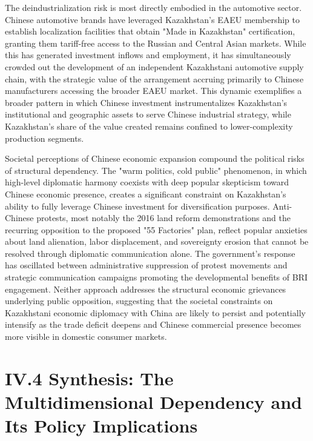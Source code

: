 \documentclass[12pt]{article}
\begin{document}
The deindustrialization risk is most directly embodied in the automotive sector. Chinese automotive brands have leveraged Kazakhstan's EAEU membership to establish localization facilities that obtain "Made in Kazakhstan" certification, granting them tariff-free access to the Russian and Central Asian markets. While this has generated investment inflows and employment, it has simultaneously crowded out the development of an independent Kazakhstani automotive supply chain, with the strategic value of the arrangement accruing primarily to Chinese manufacturers accessing the broader EAEU market. This dynamic exemplifies a broader pattern in which Chinese investment instrumentalizes Kazakhstan's institutional and geographic assets to serve Chinese industrial strategy, while Kazakhstan's share of the value created remains confined to lower-complexity production segments.\par

Societal perceptions of Chinese economic expansion compound the political risks of structural dependency. The "warm politics, cold public" phenomenon, in which high-level diplomatic harmony coexists with deep popular skepticism toward Chinese economic presence, creates a significant constraint on Kazakhstan's ability to fully leverage Chinese investment for diversification purposes. Anti-Chinese protests, most notably the 2016 land reform demonstrations and the recurring opposition to the proposed "55 Factories" plan, reflect popular anxieties about land alienation, labor displacement, and sovereignty erosion that cannot be resolved through diplomatic communication alone. The government's response has oscillated between administrative suppression of protest movements and strategic communication campaigns promoting the developmental benefits of BRI engagement. Neither approach addresses the structural economic grievances underlying public opposition, suggesting that the societal constraints on Kazakhstani economic diplomacy with China are likely to persist and potentially intensify as the trade deficit deepens and Chinese commercial presence becomes more visible in domestic consumer markets.\par

\section{IV.4 Synthesis: The Multidimensional Dependency and Its Policy Implications}
\end{document}
